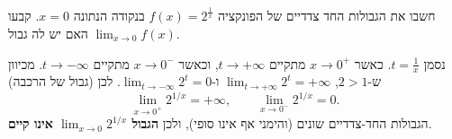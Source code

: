 
\begin{question}
חשבו את הגבולות החד צדדיים של הפונקציה $f(x)=2^{\frac{1}{x}}$ בנקודה הנתונה $x=0$. קבעו האם יש לה גבול $\lim_{x\to 0}f(x)$.
\end{question}

\begin{solution}
נסמן $t=\frac1x$. כאשר $x\to 0^+$ מתקיים $t\to+\infty$, וכאשר $x\to 0^-$ מתקיים $t\to-\infty$. מכיוון ש-$2>1$, $\lim_{t\to+\infty}2^t=+\infty$ ו-$\lim_{t\to-\infty}2^t=0$. לכן (גבול של הרכבה)
\[ \lim_{x\to0^+}2^{1/x}=+\infty,\qquad \lim_{x\to0^-}2^{1/x}=0. \]
הגבולות החד-צדדיים שונים (והימני אף אינו סופי), ולכן \textbf{הגבול $\lim_{x\to0}2^{1/x}$ אינו קיים}.
\end{solution}
